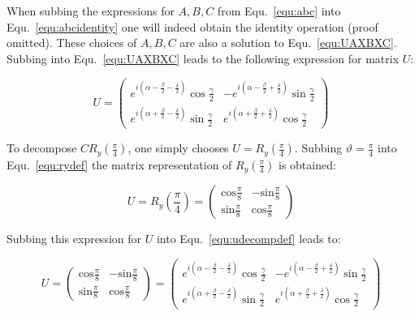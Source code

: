 When subbing the expressions for $A,B,C$ from Equ.~\ref{equ:abc} into Equ.~\ref{equ:abcidentity} one will indeed obtain the identity operation (proof omitted). These choices of $A,B,C$ are also a solution to Equ.~\ref{equ:UAXBXC}. Subbing into Equ.~\ref{equ:UAXBXC} leads to the following expression for matrix $U$:

\begin{equation}
\label{equ:udecompdef}
U = \begin{pmatrix}
 e^{i(\alpha-\frac{\beta}{2}-\frac{\delta}{2})}\cos{\frac{\gamma}{2}} & -e^{i(\alpha-\frac{\beta}{2}+\frac{\delta}{2})}\sin{\frac{\gamma}{2}} \\ 
e^{i(\alpha+\frac{\beta}{2}-\frac{\delta}{2})}\sin{\frac{\gamma}{2}} & e^{i(\alpha+\frac{\beta}{2}+\frac{\delta}{2})}\cos{\frac{\gamma}{2}}
 \end{pmatrix}
\end{equation}

To decompose $CR_y(\frac{\pi}{4})$, one simply chooses $U = R_y(\frac{\pi}{4})$. Subbing $\vartheta = \frac{\pi}{4}$ into Equ.~\ref{equ:rydef} the matrix representation of $R_y(\frac{\pi}{4})$ is obtained:

\begin{equation}
U = R_y(\frac{\pi}{4}) = \begin{pmatrix}
\text{cos}\frac{\pi}{8} & -\text{sin}\frac{\pi}{8} \\
\text{sin}\frac{\pi}{8} & \text{cos}\frac{\pi}{8}
\end{pmatrix}
\end{equation}

Subbing this expression for $U$ into Equ.~\ref{equ:udecompdef} leads to:

\begin{equation}
\label{equ:udecompsubbed}
U = \begin{pmatrix}
\text{cos}\frac{\pi}{8} & -\text{sin}\frac{\pi}{8} \\
\text{sin}\frac{\pi}{8} & \text{cos}\frac{\pi}{8}
\end{pmatrix} = \begin{pmatrix}
 e^{i(\alpha-\frac{\beta}{2}-\frac{\delta}{2})}\cos{\frac{\gamma}{2}} & -e^{i(\alpha-\frac{\beta}{2}+\frac{\delta}{2})}\sin{\frac{\gamma}{2}} \\ 
e^{i(\alpha+\frac{\beta}{2}-\frac{\delta}{2})}\sin{\frac{\gamma}{2}} & e^{i(\alpha+\frac{\beta}{2}+\frac{\delta}{2})}\cos{\frac{\gamma}{2}}
 \end{pmatrix}
\end{equation}

